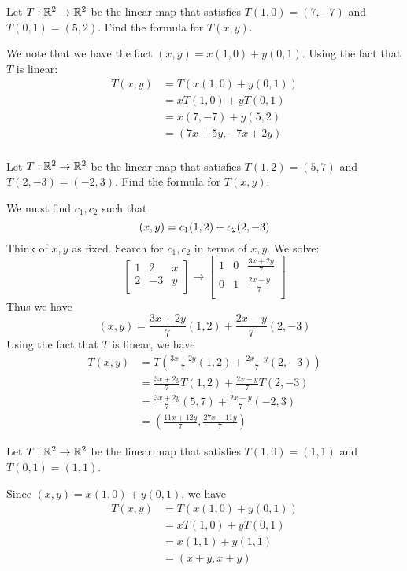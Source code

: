 \documentclass{article}
\begin{document}
\begin{example}
  Let $T: \mathbb{R}^2 \to \mathbb{R}^2$ be the linear map that satisfies $T(1, 0) = (7, -7)$ and $T(0, 1) = (5, 2)$. Find the formula for $T(x, y)$.

  We note that we have the fact $(x, y) = x(1, 0) + y(0, 1)$. Using the fact that $T$ is linear:
  \begin{align*}
    T(x, y) &= T(x(1, 0) + y(0, 1))\\
    &= xT(1, 0) + yT(0, 1)\\
    &= x(7, -7) + y(5, 2)\\
    &= (7x + 5y, -7x + 2y)\\
  \end{align*}
\end{example}
\begin{example}
  Let $T: \mathbb{R}^2 \to \mathbb{R}^2$ be the linear map that satisfies $T(1, 2) = (5, 7)$ and $T(2, -3) = (-2, 3)$. Find the formula for $T(x, y)$.

  We must find $c_1, c_2$ such that \[
    (x, y) = c_1(1, 2) + c_2(2, -3)\\
  \]
  Think of $x, y$ as fixed. Search for $c_1,c_2$ in terms of $x, y$. We solve:
  \[
    \begin{bmatrix}
      1 & 2 & x\\
      2 & -3 & y\\
    \end{bmatrix} \to
    \begin{bmatrix}
      1 & 0 & \frac{3x + 2y}{7}\\
      0 & 1 & \frac{2x - y}{7}\\
    \end{bmatrix}
  \]
  Thus we have \[
    (x, y) = \frac{3x + 2y}{7}(1, 2) + \frac{2x - y}{7}(2, -3)
  \]
  Using the fact that $T$ is linear, we have
  \begin{align*}
    T(x,y) &= T\left(\frac{3x + 2y}{7}(1, 2) + \frac{2x - y}{7}(2, -3)\right)\\
    &= \frac{3x + 2y}{7}T(1, 2) + \frac{2x - y}{7}T(2, -3)\\
    &= \frac{3x + 2y}{7}(5, 7) + \frac{2x - y}{7}(-2, 3)\\
    &= \left(\frac{11x + 12y}{7}, \frac{27x + 11y}{7}\right)
  \end{align*}
\end{example}
\begin{example}
  Let $T: \mathbb{R}^2 \to \mathbb{R}^2$ be the linear map that satisfies $T(1, 0) = (1, 1)$ and $T(0, 1) = (1, 1)$.

  Since $(x, y) = x(1, 0) + y(0, 1)$, we have
  \begin{align*}
    T(x, y) &= T(x(1, 0) + y(0, 1))\\
    &= xT(1, 0) + yT(0, 1)\\
    &= x(1, 1) + y(1, 1)\\
    &= (x+y, x+y)\\
  \end{align*}
\end{example}
\end{document}
